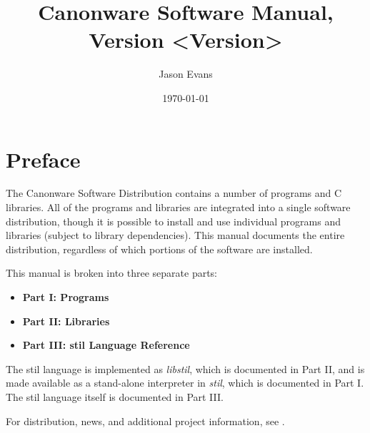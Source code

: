 \documentclass[10pt,titlepage]{book}
\title{Canonware Software Manual, Version <Version>}
\author{Jason Evans}
\date{\today}
\newcommand{\clearemptydoublepage}{\newpage{\pagestyle{empty}\cleardoublepage}}
\newcommand{\binname}[1]{{\em #1}}
\newcommand{\libname}[1]{{\em #1}}
\begin{document}
\maketitle
\clearemptydoublepage

\pagestyle{fancy}


\tableofcontents
\clearemptydoublepage




\part*{Preface}
The Canonware Software Distribution contains a number of programs and C
libraries.  All of the programs and libraries are integrated into a single
software distribution, though it is possible to install and use individual
programs and libraries (subject to library dependencies).  This manual documents
the entire distribution, regardless of which portions of the software are
installed.

This manual is broken into three separate parts:
\begin{itemize}
\item{\bf{Part I}: Programs}
\item{\bf{Part II}: Libraries}
\item{\bf{Part III}: stil Language Reference}
\end{itemize}

The stil language is implemented as \libname{libstil}, which is documented in
Part II, and is made available as a stand-alone interpreter in \binname{stil},
which is documented in Part I.  The stil language itself is documented in Part
III.

For distribution, news, and additional project information, see
.

%
%
\lhead[\bfseries\thepage]{\bfseries\rightmark}
\pagestyle{fancy}
\clearemptydoublepage
\end{document}
